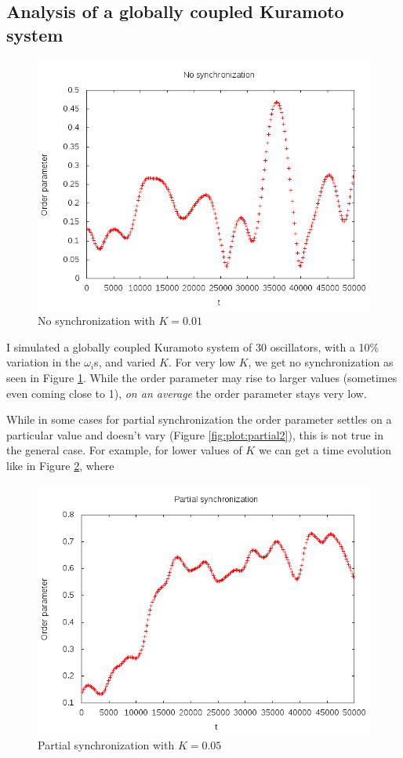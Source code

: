 \documentclass[12pt]{article}
\begin{document}
\subsection{Analysis of a globally coupled Kuramoto system}
\begin{figure}
\centering
\includegraphics[scale=0.5]{data/strange}
\caption{No synchronization with $K=0.01$}
\label{fig:plot:nosynchro}
\end{figure}

I simulated a globally coupled Kuramoto system of 30 oscillators, with a 10\% variation in the $\omega_i$s, and varied $K$. For very low $K$, we get no synchronization as seen in Figure \ref{fig:plot:nosynchro}. While the order parameter may rise to larger values (sometimes even coming close to 1), \emph{on an average} the order parameter stays very low.

While in some cases for partial synchronization the order parameter settles on a particular value and doesn't vary (Figure \ref{fig:plot:partial2}), this is not true in the general case. For example, for lower values of $K$ we can get a time evolution like in Figure \ref{fig:plot:partial1}, where
\begin{figure}
\centering
\includegraphics[scale=0.5]{data/partialsm}
\caption{Partial synchronization with $K=0.05$}
\label{fig:plot:partial1}
\end{figure}
\end{document}
